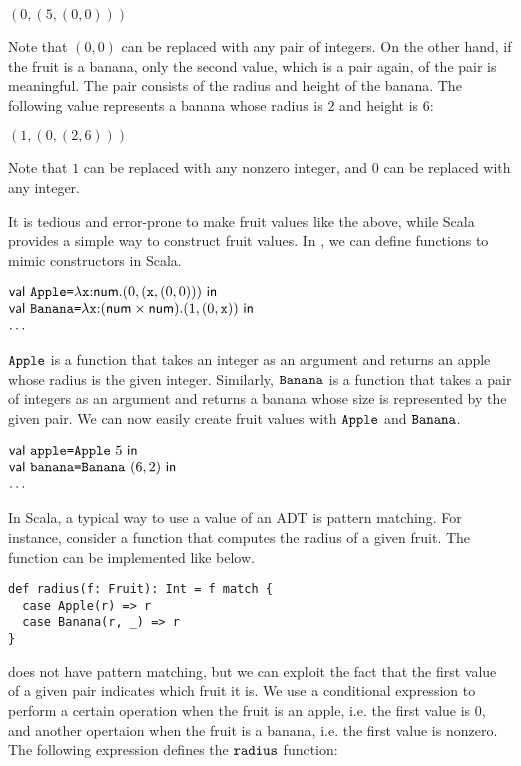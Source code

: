 $(0,(5,(0,0)))$

Note that $(0,0)$ can be replaced with any pair of integers. On the other hand,
if the fruit is a banana, only the second value, which is a pair again, of the
pair is meaningful. The pair consists of the radius and height of the banana.
The following value represents a banana whose radius is $2$ and height is $6$:

$(1,(0,(2,6)))$

Note that $1$ can be replaced with any nonzero integer, and $0$ can be replaced
with any integer.

It is tedious and error-prone to make fruit values like the above, while Scala
provides a simple way to construct fruit values. In \plang, we can define
functions to mimic constructors in Scala.

$
\begin{array}{@{}l}
  \ebind{\code{Apple}}{\efunt{\cx}{\tnum}{(0,(\cx,(0,0)))}}{\\
  \ebind{\code{Banana}}{\efunt{\cx}{(\tnum\times\tnum)}{(1,(0,\cx))}}{\\
  \ldots}}
\end{array}
$

$\texttt{Apple}$ is a function that takes an integer as an argument and returns an
apple whose radius is the given integer. Similarly, $\texttt{Banana}$ is a
function that takes a pair of integers as an argument and returns a banana whose
size is represented by the given pair. We can now easily create fruit values
with $\texttt{Apple}$ and $\texttt{Banana}$.

$
\begin{array}{@{}l}
  \ebind{\code{apple}}{\code{Apple}\ 5}{\\
  \ebind{\code{banana}}{\code{Banana}\ (6,2)}{\\
  \ldots}}
\end{array}
$

In Scala, a typical way to use a value of an ADT is pattern matching. For
instance, consider a function that computes the radius of a given fruit.
The function can be implemented like below.

\begin{verbatim}
def radius(f: Fruit): Int = f match {
  case Apple(r) => r
  case Banana(r, _) => r
}
\end{verbatim}

\plang does not have pattern matching, but we can exploit the fact that the
first value of a given pair indicates which fruit it is. We use a conditional
expression to perform a certain operation when the fruit is an apple, i.e. the
first value is $0$, and another opertaion when the fruit is a banana,
i.e. the first value is nonzero. The following expression defines the
$\texttt{radius}$ function:

